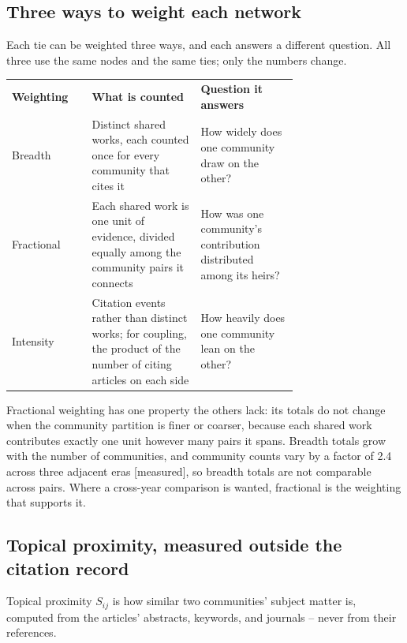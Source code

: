 \documentclass[11pt]{article}
\newcommand{\doublerule}{%
  \specialrule{\lightrulewidth}{0pt}{\doublerulesep}%
  \specialrule{\lightrulewidth}{0pt}{0pt}}
\newcommand{\meas}{{\footnotesize\textsf{[measured]}}}
\begin{document}
\subsection{Three ways to weight each network}
\label{sec:weightings}

Each tie can be weighted three ways, and each answers a different question. All three use
the same nodes and the same ties; only the numbers change.

\begin{center}
\small
\begin{tabular}{@{}lp{0.38\linewidth}p{0.34\linewidth}@{}}
\toprule
\textbf{Weighting} & \textbf{What is counted} & \textbf{Question it answers}\\
\doublerule
Breadth    & Distinct shared works, each counted once for every community that cites it &
             How widely does one community draw on the other?\\[3pt]
Fractional & Each shared work is one unit of evidence, divided equally among the community
             pairs it connects &
             How was one community's contribution distributed among its heirs?\\[3pt]
Intensity  & Citation events rather than distinct works; for coupling, the product of the
             number of citing articles on each side &
             How heavily does one community lean on the other?\\
\bottomrule
\end{tabular}
\end{center}

Fractional weighting has one property the others lack: its totals do not change when the
community partition is finer or coarser, because each shared work contributes exactly one
unit however many pairs it spans. Breadth totals grow with the number of communities, and
community counts vary by a factor of 2.4 across three adjacent eras \meas{}, so breadth
totals are not comparable across pairs. Where a cross-year comparison is wanted, fractional
is the weighting that supports it.

\subsection{Topical proximity, measured outside the citation record}
\label{sec:proximity}

Topical proximity $S_{ij}$ is how similar two communities' subject matter is, computed from
the articles' abstracts, keywords, and journals -- never from their references.
\end{document}
